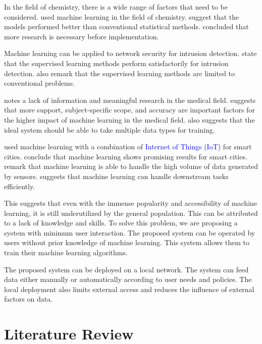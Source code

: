 \documentclass[a4paper,fleqn]{cas-dc}
\newcommand{\responsemodsm}[1]{\textcolor{blue}{#1}}
\begin{document}
In the field of chemistry, there is a wide range of factors that need to be considered. \cite*{ref_paper_10} used machine learning in the field of chemistry. \citeauthor{ref_paper_10} suggest that the models performed better than conventional statistical methods. \citeauthor{ref_paper_10} concluded that more research is necessary before implementation.

Machine learning can be applied to network security for intrusion detection. \cite*{ref_paper_21} state that the supervised learning methods perform satisfactorily for intrusion detection. \citeauthor{ref_paper_21} also remark that the supervised learning methods are limited to conventional problems.

\cite*{ref_paper_24} notes a lack of information and meaningful research in the medical field. \citeauthor{ref_paper_24} suggests that more support, subject-specific scope, and accuracy are important factors for the higher impact of machine learning in the medical field. \citeauthor{ref_paper_24} also suggests that the ideal system should be able to take multiple data types for training.

\cite*{ref_paper_29} used machine learning with a combination of \responsemodsm{Internet of Things (IoT)} for smart cities. \citeauthor{ref_paper_29} conclude that machine learning shows promising results for smart cities. \citeauthor{ref_paper_29} remark that machine learning is able to handle the high volume of data generated by sensors. \cite*{ref_paper_12} suggests that machine learning can handle downstream tasks efficiently.

This suggests that even with the immense popularity and accessibility of machine learning, it is still underutilized by the general population. This can be attributed to a lack of knowledge and skills. To solve this problem, we are proposing a system with minimum user interaction. The proposed system can be operated by users without prior knowledge of machine learning. This system allows them to train their machine learning algorithms.

The proposed system can be deployed on a local network. The system can feed data either manually or automatically according to user needs and policies. The local deployment also limits external access and reduces the influence of external factors on data.

\section{Literature Review}\label{sec:literature_review}
\end{document}
